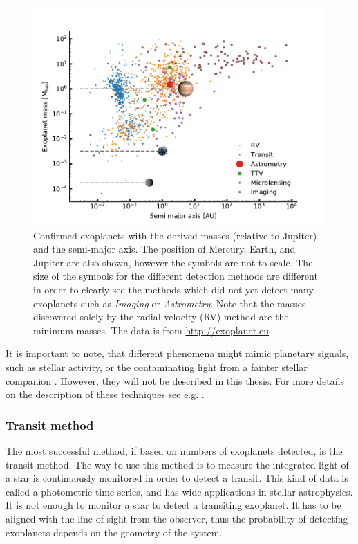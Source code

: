 \begin{figure}[htpb!]
    \centering
    \includegraphics[width=1.0\linewidth]{figures/exoplanetDetectionType.pdf}
    \caption{Confirmed exoplanets with the derived masses (relative to Jupiter) and the semi-major
             axis. The position of Mercury, Earth, and Jupiter are also shown, however the symbols
             are not to scale. The size of the symbols for the different detection methods are
             different in order to clearly see the methods which did not yet detect many exoplanets
             such as \emph{Imaging} or \emph{Astrometry}. Note that the masses discovered solely by
             the radial velocity (RV) method are the minimum masses. The data is from
             \url{http://exoplanet.eu}}
    \label{fig:detectionTypes}
\end{figure}

It is important to note, that different phenomena might mimic planetary signals, such as stellar
activity, or the contaminating light from a fainter stellar companion \citep[see
e.g.][]{Queloz2001,Oshagh2013,Oshagh2014}. However, they will not be described in this thesis. For
more details on the description of these techniques see e.g. \citet{Seager2010}.


\subsubsection{Transit method}
\label{sec:transitMethod}

The most successful method, if based on numbers of exoplanets detected, is the transit method. The
way to use this method is to measure the integrated light of a star is continuously monitored in
order to detect a transit. This kind of data is called a photometric time-series, and has wide
applications in stellar astrophysics. It is not enough to monitor a star to detect a transiting
exoplanet. It has to be aligned with the line of sight from the observer, thus the probability of
detecting exoplanets depends on the geometry of the system.

